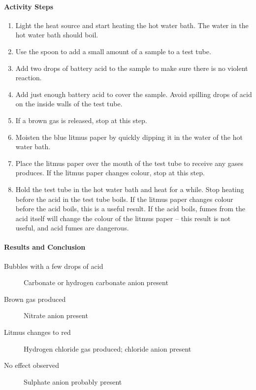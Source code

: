 \paragraph{Activity Steps}
\begin{enumerate}
\item{Light the heat source and start heating the hot water bath. The water in the hot water bath should boil.}
\item{Use the spoon to add a small amount of a sample to a test tube.}
\item{Add two drops of battery acid to the sample to make sure there is no violent reaction.}
\item{Add just enough battery acid to cover the sample. Avoid spilling drops of acid on the inside walls of the test tube.}
\item{If a brown gas is released, stop at this step.}
\item{Moisten the blue litmus paper by quickly dipping it in the water of the hot water bath.}
\item{Place the litmus paper over the mouth of the test tube to receive any gases produces. If the litmus paper changes colour, stop at this step.}
\item{Hold the test tube in the hot water bath and heat for a while. Stop heating before the acid in the test tube boils. If the litmus paper changes colour before the acid boils, this is a useful result. If the acid boils, fumes from the acid itself will change the colour of the litmus paper -- this result is not useful, and acid fumes are dangerous.}
\end{enumerate}

\paragraph{Results and Conclusion}
\begin{description}
\item[Bubbles with a few drops of acid]{Carbonate or hydrogen carbonate anion  present}
\item[Brown gas produced]{Nitrate anion present}
\item[Litmus changes to red]{Hydrogen chloride gas produced; chloride anion present}
\item[No effect observed]{Sulphate anion probably present}
\end{description}

